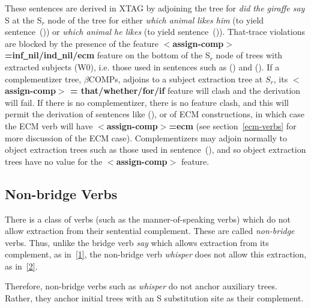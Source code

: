 
These sentences are derived in XTAG by adjoining the tree for {\it did the
giraffe say} S at the S$_r$ node of the tree for either {\it which animal likes
him} (to yield sentence~()) or {\it which animal he likes} (to yield
sentence~()).  That-trace violations are blocked by the presence of the
feature {\bf $<$assign-comp$>$=inf\underline{~}nil/ind\underline{~}nil/ecm}
feature on the bottom of the S$_r$ node of trees with extracted subjects (W0),
i.e. those used in sentences such as () and ().  
If a complementizer tree, $\beta$COMPs, adjoins to a subject
extraction tree at $S_r$, its {\bf $<$assign-comp$>$ =
that/whether/for/if} feature will clash and the derivation will
fail. If there is no complementizer, there is no feature clash, and this will
permit the derivation of sentences like (), or of ECM constructions, in
which case the ECM verb will have {\bf $<$assign-comp$>$=ecm} (see
section~\ref{ecm-verbs} for more discussion of the ECM case).
Complementizers may adjoin normally to object extraction trees such as those
used in sentence~(), and so object extraction trees have no value 
for the {\bf $<$assign-comp$>$} feature.


\subsection{Non-bridge Verbs}

There is a class of verbs (such as the manner-of-speaking verbs) which do not
allow extraction from their sentential complement. These are called
{\it non-bridge} verbs. Thus, unlike the bridge verb {\it say} which allows
extraction from its complement, as in~\ref{1}, the non-bridge verb {\it
whisper} does not allow this extraction, as in~\ref{2}. 


Therefore, non-bridge verbs such as {\it whisper} do not anchor auxiliary
trees. Rather, they anchor initial trees with an S substitution site as their
complement. 

